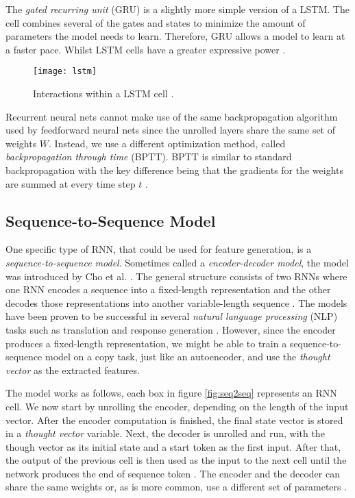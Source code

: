 The \textit{gated recurring unit} (GRU) is a slightly more simple version of a LSTM.
The cell combines several of the gates and states to minimize the amount of parameters the model needs to learn.
Therefore, GRU allows a model to learn at a faster pace.
Whilst LSTM cells have a greater expressive power \cite{hochreiter1997long,LSTM,cho2014learning}.

\begin{figure}[ht]
  \centering
  \texttt{[image: lstm]}
  \caption{Interactions within a LSTM cell \cite{LSTM}.}
  \label{fig:lstm}
\end{figure}

Recurrent neural nets cannot make use of the same backpropagation algorithm used by feedforward neural nets since the unrolled layers share the same set of weights $W$.
Instead, we use a different optimization method, called \textit{backpropagation through time} (BPTT).
BPTT is similar to standard backpropagation with the key difference being that the gradients for the weights are summed at every time step $t$ \cite{britz_2016}.

\subsection{Sequence-to-Sequence Model} \label{sec:seq2seq}

One specific type of RNN, that could be used for feature generation, is a \textit{sequence-to-sequence model}.
Sometimes called a \textit{encoder-decoder model}, the model was introduced by Cho et al. \cite{cho2014learning}.
The general structure consists of two RNNs where one RNN encodes a sequence into a fixed-length representation and the other decodes those representations into another variable-length sequence \cite{cho2014learning}.
The models have been proven to be successful in several \textit{natural language processing} (NLP) tasks such as translation and response generation \cite{cho2014learning,sutskever_vinyals_le,tensorflowseq2seq}.
However, since the encoder produces a fixed-length representation, we might be able to train a sequence-to-sequence model on a copy task, just like an autoencoder, and use the \textit{thought vector} as the extracted features.

The model works as follows, each box in figure \ref{fig:seq2seq} represents an RNN cell.
We now start by unrolling the encoder, depending on the length of the input vector.
After the encoder computation is finished, the final state vector is stored in a \textit{thought vector} variable.
Next, the decoder is unrolled and run, with the though vector as its initial state and a start token as the first input.
After that, the output of the previous cell is then used as the input to the next cell until the network produces the end of sequence token \cite{cho2014learning}.
The encoder and the decoder can share the same weights or, as is more common, use a different set of parameters \cite{tensorflowseq2seq}.

